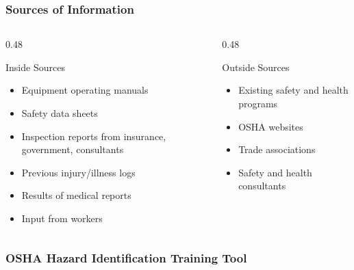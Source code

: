 \begin{frame}
	\frametitle{Sources of Information}
    
    \begin{columns}[t]
        \begin{column}{0.48\linewidth}
            \begin{block}{Inside Sources}
                \begin{itemize}
                    \item Equipment operating manuals
                    \item Safety data sheets
                    \item Inspection reports from insurance, government, consultants
                    \item Previous injury/illness logs
                    \item Results of medical reports
                    \item Input from workers
                \end{itemize}
            \end{block}
        \end{column}
        \begin{column}{0.48\linewidth}
            \begin{block}{Outside Sources}
                \begin{itemize}
                    \item Existing safety and health programs
                    \item OSHA websites
                    \item Trade associations
                    \item Safety and health consultants
                \end{itemize}
            \end{block}
        \end{column}        
    \end{columns}
\end{frame}

\begin{frame}
	\frametitle{OSHA Hazard Identification Training Tool}

\end{frame}

